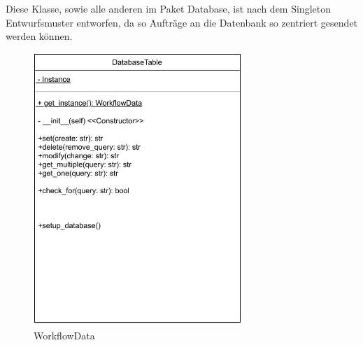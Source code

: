 Diese Klasse, sowie alle anderen im Paket Database, ist nach dem Singleton Entwurfsmuster entworfen, da so Aufträge an die Datenbank so zentriert gesendet werden können.
\begin{figure}[h]
	\centering
	\includegraphics[width=0.7\textwidth]{res/Klassen/DatabaseTable.pdf} 
	\caption{WorkflowData}
	\label{fig:workflowDataClass}
\end{figure}

